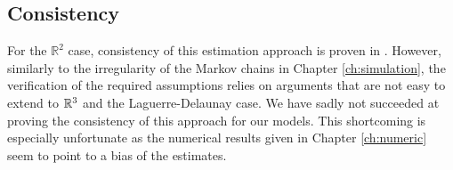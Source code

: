 \subsection{Consistency}
For the $\mathbb R^2$ case, consistency of this estimation approach is proven in \cite{DereudreLavancier2009}. However, similarly to the irregularity of the Markov chains in Chapter \ref{ch:simulation}, the verification of the required assumptions relies on arguments that are not easy to extend to ${\mathbb R^3}$ and the Laguerre-Delaunay case. We have sadly not succeeded at proving the consistency of this approach for our models. This shortcoming is especially unfortunate as the numerical results given in Chapter \ref{ch:numeric} seem to point to a bias of the estimates. 
